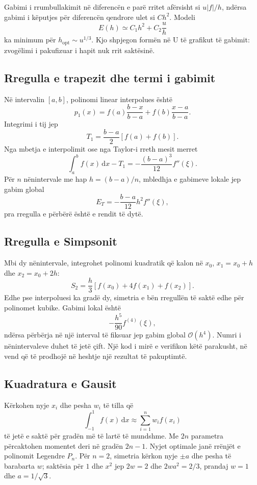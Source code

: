 \documentclass[11pt,oneside,openany]{book}
\newcommand{\dd}{\,\mathrm{d}}
\newcommand{\Oh}{\mathcal{O}}
\begin{document}
Gabimi i rrumbullakimit në diferencën e parë rritet afërsisht si $u|f|/h$, ndërsa gabimi i këputjes për diferencën qendrore ulet si $C h^2$. Modeli
\begin{equation}
 E(h)\simeq C_1h^2+C_2\frac{u}{h}
\end{equation}
ka minimum për $h_{\mathrm{opt}}\sim u^{1/3}$. Kjo shpjegon formën në U të grafikut të gabimit: zvogëlimi i pakufizuar i hapit nuk rrit saktësinë.

\subsection{Rregulla e trapezit dhe termi i gabimit}
Në intervalin $[a,b]$, polinomi linear interpolues është
\begin{equation}
 p_1(x)=f(a)\frac{b-x}{b-a}+f(b)\frac{x-a}{b-a}.
\end{equation}
Integrimi i tij jep
\begin{equation}
 T_1=\frac{b-a}{2}[f(a)+f(b)].
\end{equation}
Nga mbetja e interpolimit ose nga Taylor-i rreth mesit merret
\begin{equation}
 \int_a^b f(x)\dd x-T_1=-\frac{(b-a)^3}{12}f''(\xi).
\end{equation}
Për $n$ nënintervale me hap $h=(b-a)/n$, mbledhja e gabimeve lokale jep gabim global
\begin{equation}
 E_T=-\frac{b-a}{12}h^2 f''(\xi),
\end{equation}
pra rregulla e përbërë është e rendit të dytë.

\subsection{Rregulla e Simpsonit}
Mbi dy nënintervale, integrohet polinomi kuadratik që kalon në $x_0$, $x_1=x_0+h$ dhe $x_2=x_0+2h$:
\begin{equation}
 S_2=\frac{h}{3}[f(x_0)+4f(x_1)+f(x_2)].
\end{equation}
Edhe pse interpoluesi ka gradë dy, simetria e bën rregullën të saktë edhe për polinomet kubike. Gabimi lokal është
\begin{equation}
 -\frac{h^5}{90}f^{(4)}(\xi),
\end{equation}
ndërsa përbërja në një interval të fiksuar jep gabim global $\Oh(h^4)$. Numri i nënintervaleve duhet të jetë çift. Një kod i mirë e verifikon këtë parakusht, në vend që të prodhojë në heshtje një rezultat të pakuptimtë.

\subsection{Kuadratura e Gausit}
Kërkohen nyje $x_i$ dhe pesha $w_i$ të tilla që
\begin{equation}
 \int_{-1}^{1}f(x)\dd x\approx\sum_{i=1}^{n}w_if(x_i)
\end{equation}
të jetë e saktë për gradën më të lartë të mundshme. Me $2n$ parametra përcaktohen momentet deri në gradën $2n-1$. Nyjet optimale janë rrënjët e polinomit Legendre $P_n$. Për $n=2$, simetria kërkon nyje $\pm a$ dhe pesha të barabarta $w$; saktësia për $1$ dhe $x^2$ jep $2w=2$ dhe $2wa^2=2/3$, prandaj $w=1$ dhe $a=1/\sqrt3$.
\end{document}

